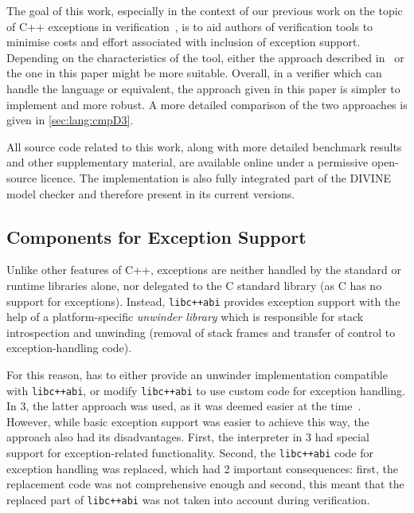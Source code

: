 The goal of this work, especially in the context of our previous work
on the topic of C++ exceptions in
verification~, is to aid authors of
verification tools to minimise costs and effort associated with
inclusion of exception support. Depending on the characteristics of the
tool, either the approach described in~ or
the one in this paper might be more suitable. Overall, in a verifier
which can handle the \divm{} language or equivalent, the approach given in
this paper is simpler to implement and more robust. A more detailed
comparison of the two approaches is given in \autoref{sec:lang:cmpD3}.

All source code related to this work, along with more detailed
benchmark results and other supplementary material, are available online
under a permissive open-source licence.
The implementation is also fully integrated part of the DIVINE model checker
and therefore present in its current versions.

\subsection{Components for Exception Support}

Unlike other features of C++, exceptions are neither handled by the
standard or runtime libraries alone, nor delegated to the C standard
library (as C has no support for exceptions). Instead,
\texttt{libc++abi} provides exception support with the help of a
platform-specific \emph{unwinder library} which is responsible for stack
introspection and unwinding (removal of stack frames and transfer of
control to exception-handling code).

For this reason, \divine{} has to either provide an unwinder implementation
compatible with \texttt{libc++abi}, or modify \texttt{libc++abi} to use
custom code for exception handling. In \divine{} 3, the latter approach was
used, as it was deemed easier at the
time~. However, while basic exception
support was easier to achieve this way, the approach also had its
disadvantages. First, the \llvm{} interpreter in \divine{} 3 had special
support for exception-related functionality. Second, the
\texttt{libc++abi} code for exception handling was replaced, which had 2
important consequences: first, the replacement code was not
comprehensive enough
and second, this meant that the replaced part of \texttt{libc++abi} was
not taken into account during verification.

